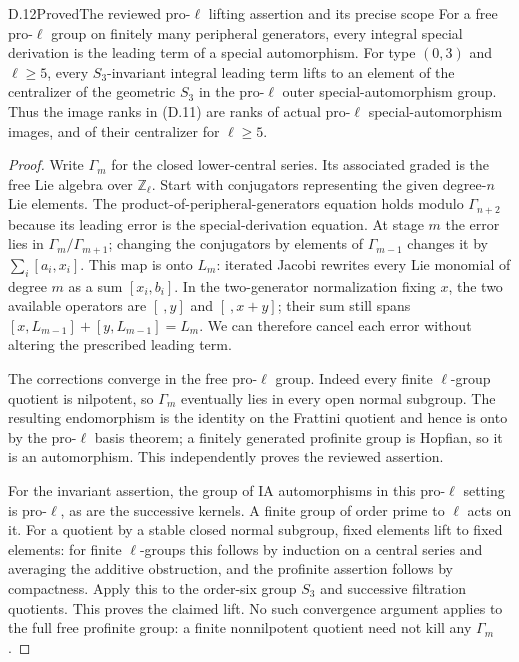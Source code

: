 \begin{statement}{D.12}{Proved}{The reviewed pro-$\ell$ lifting assertion and its precise scope}
For a free pro-$\ell$ group on finitely many peripheral generators, every integral special derivation is the leading term of a special automorphism. For type $(0,3)$ and $\ell\geq5$, every $S_3$-invariant integral leading term lifts to an element of the centralizer of the geometric $S_3$ in the pro-$\ell$ outer special-automorphism group. Thus the image ranks in (D.11) are ranks of actual pro-$\ell$ special-automorphism images, and of their centralizer for $\ell\geq5$.
\end{statement}
\begin{proof}
Write $\Gamma_m$ for the closed lower-central series. Its associated graded is the free Lie algebra over $\mathbb Z_\ell$. Start with conjugators representing the given degree-$n$ Lie elements. The product-of-peripheral-generators equation holds modulo $\Gamma_{n+2}$ because its leading error is the special-derivation equation. At stage $m$ the error lies in $\Gamma_m/\Gamma_{m+1}$; changing the conjugators by elements of $\Gamma_{m-1}$ changes it by
$\sum_i[a_i,x_i]$. This map is onto $L_m$: iterated Jacobi rewrites every Lie monomial of degree $m$ as a sum $[x_i,b_i]$. In the two-generator normalization fixing $x$, the two available operators are $[\ ,y]$ and $[\ ,x+y]$; their sum still spans $[x,L_{m-1}]+[y,L_{m-1}]=L_m$. We can therefore cancel each error without altering the prescribed leading term.

The corrections converge in the free pro-$\ell$ group. Indeed every finite $\ell$-group quotient is nilpotent, so $\Gamma_m$ eventually lies in every open normal subgroup. The resulting endomorphism is the identity on the Frattini quotient and hence is onto by the pro-$\ell$ basis theorem; a finitely generated profinite group is Hopfian, so it is an automorphism. This independently proves the reviewed assertion.

For the invariant assertion, the group of IA automorphisms in this pro-$\ell$ setting is pro-$\ell$, as are the successive kernels. A finite group of order prime to $\ell$ acts on it. For a quotient by a stable closed normal subgroup, fixed elements lift to fixed elements: for finite $\ell$-groups this follows by induction on a central series and averaging the additive obstruction, and the profinite assertion follows by compactness. Apply this to the order-six group $S_3$ and successive filtration quotients. This proves the claimed lift. No such convergence argument applies to the full free profinite group: a finite nonnilpotent quotient need not kill any $\Gamma_m$.
\end{proof}

